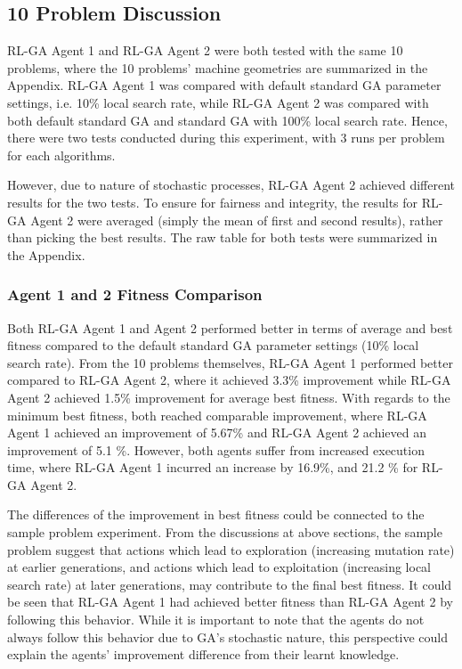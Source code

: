 \documentclass{article}
\begin{document}
\subsection{10 Problem Discussion}
RL-GA Agent 1 and RL-GA Agent 2 were both tested with the same 10 problems, where the 10 problems' machine geometries are summarized in the Appendix. RL-GA Agent 1 was compared with default standard GA parameter settings, i.e. 10\% local search rate, while RL-GA Agent 2 was compared with both default standard GA and standard GA with 100\% local search rate. Hence, there were two tests conducted during this experiment, with 3 runs per problem for each algorithms. 

However, due to nature of stochastic processes, RL-GA Agent 2 achieved different results for the two tests. To ensure for fairness and integrity, the results for RL-GA Agent 2 were averaged (simply the mean of first and second results), rather than picking the best results. The raw table for both tests were summarized in the Appendix. 

\subsubsection{Agent 1 and 2 Fitness Comparison}
Both RL-GA Agent 1 and Agent 2 performed better in terms of average and best fitness compared to the default standard GA parameter settings (10\% local search rate). From the 10 problems themselves, RL-GA Agent 1 performed better compared to RL-GA Agent 2, where it achieved 3.3\% improvement while RL-GA Agent 2 achieved 1.5\% improvement for average best fitness. With regards to the minimum best fitness, both reached comparable improvement, where RL-GA Agent 1 achieved an improvement of 5.67\% and RL-GA Agent 2 achieved an improvement of 5.1 \%. However, both agents suffer from increased execution time, where RL-GA Agent 1 incurred an increase by 16.9\%, and 21.2 \% for RL-GA Agent 2.

The differences of the improvement in best fitness could be connected to the sample problem experiment. From the discussions at above sections, the sample problem suggest that actions which lead to exploration (increasing mutation rate) at earlier generations, and actions which lead to exploitation (increasing local search rate) at later generations, may contribute to the final best fitness. It could be seen that RL-GA Agent 1 had achieved better fitness than RL-GA Agent 2 by following this behavior. While it is important to note that the agents do not always follow this behavior due to GA's stochastic nature, this perspective could explain the agents' improvement difference from their learnt knowledge. 
\end{document}
